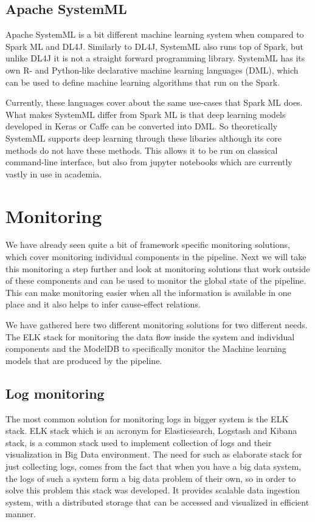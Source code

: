 \subsection{Apache SystemML}

Apache SystemML is a bit different machine learning system when compared to Spark ML and DL4J.
Similarly to DL4J, SystemML also runs top of Spark, but unlike DL4J it is not a straight forward programming library.
SystemML has its own R- and Python-like declarative machine learning languages (DML), which can be used to define machine learning algorithms that run on the Spark. \cite{systemml}

Currently, these languages cover about the same use-cases that Spark ML does.
What makes SystemML differ from Spark ML is that deep learning models developed in Keras or Caffe can be converted into DML.
So theoretically SystemML supports deep learning through these libaries although its core methods do not have these methods.
This allows it to be run on classical command-line interface, but also from jupyter notebooks which are currently vastly in use in academia. \cite{systemml}

\section{Monitoring}

We have already seen quite a bit of framework specific monitoring solutions, which cover monitoring individual components in the pipeline.
Next we will take this monitoring a step further and look at monitoring solutions that work outside of these components and can be used to monitor the global state of the pipeline.
This can make monitoring easier when all the information is available in one place and it also helps to infer cause-effect relations.

We have gathered here two different monitoring solutions for two different needs.
The ELK stack for monitoring the data flow inside the system and individual components and the ModelDB to specifically monitor the Machine learning models that are produced by the pipeline.

\subsection{Log monitoring}

The most common solution for monitoring logs in bigger system is the ELK stack. 
ELK stack which is an acronym for Elasticsearch, Logstash and Kibana stack, is a common stack used to implement collection of logs and their visualization in Big Data environment.
The need for such as elaborate stack for just collecting logs, comes from the fact that when you have a big data system, the logs of such a system form a big data problem of their own, so in order to solve this problem this stack was developed.
It provides scalable data ingestion system, with a distributed storage that can be accessed and visualized in efficient manner. \cite{elastic}

